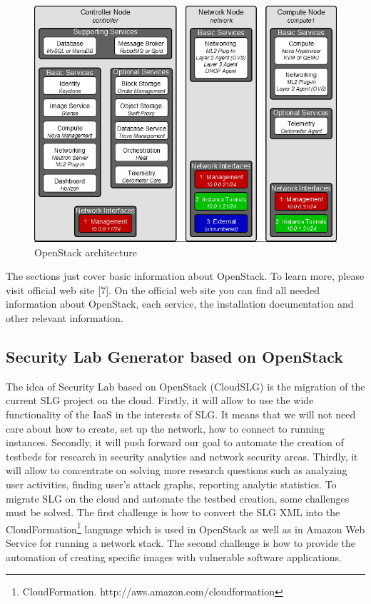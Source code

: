 \begin{figure}[ht!]
\centering
\includegraphics[width=\textwidth]{openstack_architecture.png}
\caption{OpenStack architecture}
\label{overflow}
\end{figure}

The sections just cover basic information about OpenStack. To learn more, please visit official web site [7]. On the official web site you can find all needed information about OpenStack, each service, the installation documentation and other relevant information. 


\subsection{Security Lab Generator based on OpenStack}
The idea of Security Lab based on OpenStack (CloudSLG) is the migration of the current SLG project on the cloud. Firstly, it will allow to use the wide functionality of the IaaS in the interests of SLG. It means that we will not need care about how to create, set up the network, how to connect to running instances. Secondly, it will push forward our goal to automate the creation of testbeds for research in security analytics and network security areas. Thirdly, it will allow to concentrate on solving more research questions such as analyzing user activities, finding user's attack graphs, reporting analytic statistics. To migrate SLG on the cloud and automate the testbed creation, some challenges must be solved. The first challenge is how to convert the SLG XML into the CloudFormation\footnote{CloudFormation. http://aws.amazon.com/cloudformation} language which is used in OpenStack as well as in Amazon Web Service for running a network stack. The second challenge is how to provide the automation of creating specific images with vulnerable software applications.



% 